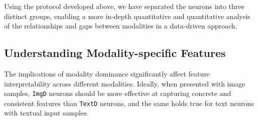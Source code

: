 
Using the protocol developed above, we have separated  the neurons into three distinct groups, enabling a more in-depth quantitative and quantitative analysis of the relationships and gaps between modalities in a data-driven approach.
\subsection{Understanding Modality-specific Features}

The implications of modality dominance significantly affect feature interpretability across different modalities. %
Ideally, when presented with image samples, \texttt{ImgD} neurons should be more effective at capturing concrete and consistent features than \texttt{TextD} neurons, and the same holds true %
for text neurons with textual input samples. 

